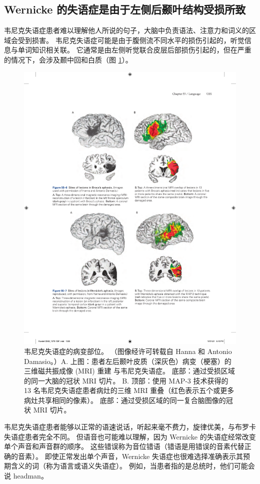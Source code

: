 \subsection{Wernicke 的失语症是由于左侧后颞叶结构受损所致}

韦尼克失语症患者难以理解他人所说的句子，大脑中负责语法、注意力和词义的区域会受到损害。 韦尼克失语症可能是由于腹侧流不同水平的损伤引起的，听觉信息与单词知识相关联。 它通常是由左侧听觉联合皮层后部损伤引起的，但在严重的情况下，会涉及颞中回和白质（图 \ref{fig:55_7}）。

\begin{figure}[htbp]
	\centering
	\includegraphics[width=0.7\linewidth]{chap55/fig_55_7}
	\caption{韦尼克失语症的病变部位。 （图像经许可转载自 Hanna 和 Antonio Damasio。）A. 上图：患者左后颞叶皮质（深灰色）病变（梗塞）的三维磁共振成像 (MRI) 重建 与韦尼克失语症。 底部：通过受损区域的同一大脑的冠状 MRI 切片。 B. 顶部：使用 MAP-3 技术获得的 13 名韦尼克失语症患者病灶的三维 MRI 重叠（红色表示五个或更多病灶共享相同的像素）。 底部：通过受损区域的同一复合脑图像的冠状 MRI 切片。}
	\label{fig:55_7}
\end{figure}

韦尼克失语症患者能够以正常的语速说话，听起来毫不费力，旋律优美，与布罗卡失语症患者完全不同。 但语音也可能难以理解，因为 Wernicke 的失语症经常改变单个声音和声音群的顺序。 这些错误称为音位错语（错语是用错误的音素代替正确的音素）。 即使正常发出单个声音，Wernicke 失语症也很难选择准确表示其预期含义的词（称为语言或语义失语症）。 例如，当患者指的是总统时，他们可能会说 headman。

